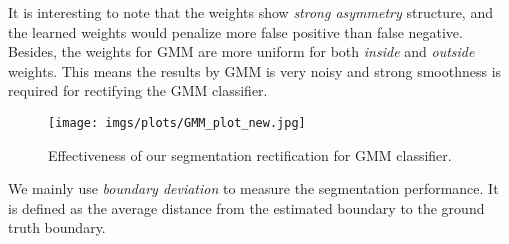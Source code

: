 \documentclass[10pt,journal,compsoc]{newIEEEtran}
\begin{document}
It is interesting to note that the weights show \emph{strong asymmetry} structure, and the learned weights would penalize more false positive than false negative. Besides, the weights for GMM are more uniform for both \emph{inside} and \emph{outside} weights. This means the results by GMM is very noisy and strong smoothness is required for rectifying the GMM classifier. 
\begin{figure}[t]
  \centering
  \texttt{[image: imgs/plots/GMM\_plot\_new.jpg]}\\
  \caption{Effectiveness of our segmentation rectification for GMM classifier.}\label{FIG:RstRectfyGMM}
  \vspace{-0.5cm}
  \end{figure} We mainly use \emph{boundary deviation} to measure the segmentation performance. It is defined as the average distance from the estimated boundary to the ground truth boundary. %
\end{document}
